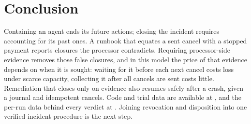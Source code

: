 \section{Conclusion}\label{sec:conclusion}
Containing an agent ends its future actions; closing the incident requires accounting for its past ones. A runbook that equates a sent cancel with a stopped payment reports closures the processor contradicts. Requiring processor-side evidence removes those false closures, and in this model the price of that evidence depends on when it is sought: waiting for it before each next cancel costs loss under scarce capacity, collecting it after all cancels are sent costs little. Remediation that closes only on evidence also resumes safely after a crash, given a journal and idempotent cancels. Code and trial data are available at \ArtifactURL, and the per-run data behind every verdict at \DataLink. Joining revocation and disposition into one verified incident procedure is the next step.
